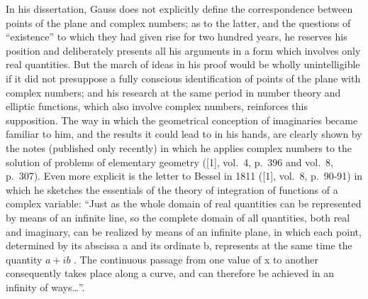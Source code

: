 In his dissertation, Gauss does not explicitly define the correspondence between points of the plane and complex numbers; as to the latter, and the questions of ``existence'' to which they had given rise for two hundred years, he reserves his position and deliberately presents all his arguments in a form which involves only real quantities. But the march of ideas in his proof would be wholly unintelligible if it did not presuppose a fully conscious identification of points of the plane with complex numbers; and his research at the same period in number theory and elliptic functions, which also involve complex numbers, reinforces this supposition. The way in which the geometrical conception of imaginaries became familiar to him, and the results it could lead to in his hands, are clearly shown by the notes (published only recently) in which he applies complex numbers to the solution of problems of elementary geometry ({[}1{]}, vol.~4, p.~396 and vol.~8, p.~307). Even more explicit is the letter to Bessel in 1811 ({[}1{]}, vol.~8, p.~90-91) in which he sketches the essentials of the theory of integration of functions of a complex variable: ``Just as the whole domain of real quantities can be represented by means of an infinite line, so the complete domain of all quantities, both real and imaginary, can be realized by means of an infinite plane, in which each point, determined by its abscissa a and its ordinate b, represents at the same time the quantity \(a + ib\) . The continuous passage from one value of x to another consequently takes place along a curve, and can therefore be achieved in an infinity of ways\ldots''.

